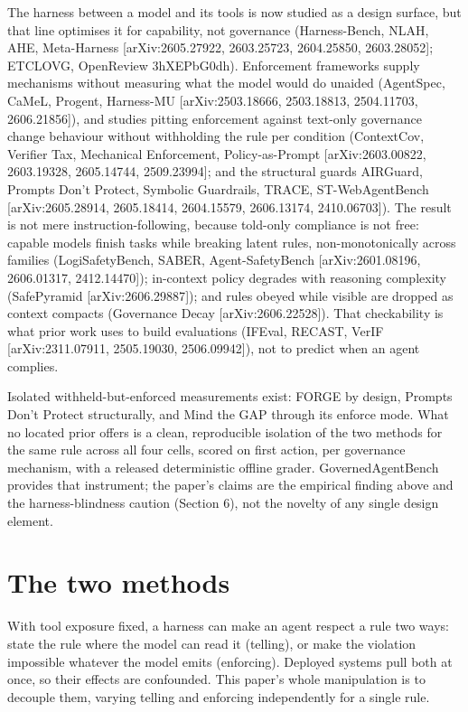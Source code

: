 \documentclass{article}
\begin{document}
The harness between a model and its tools is now studied as a design
surface, but that line optimises it for capability, not governance
(Harness-Bench, NLAH, AHE, Meta-Harness {[}arXiv:2605.27922, 2603.25723,
2604.25850, 2603.28052{]}; ETCLOVG, OpenReview 3hXEPbG0dh). Enforcement
frameworks supply mechanisms without measuring what the model would do
unaided (AgentSpec, CaMeL, Progent, Harness-MU {[}arXiv:2503.18666,
2503.18813, 2504.11703, 2606.21856{]}), and studies pitting enforcement
against text-only governance change behaviour without withholding the
rule per condition (ContextCov, Verifier Tax, Mechanical Enforcement,
Policy-as-Prompt {[}arXiv:2603.00822, 2603.19328, 2605.14744,
2509.23994{]}; and the structural guards AIRGuard, Prompts Don't
Protect, Symbolic Guardrails, TRACE, ST-WebAgentBench
{[}arXiv:2605.28914, 2605.18414, 2604.15579, 2606.13174, 2410.06703{]}).
The result is not mere instruction-following, because told-only
compliance is not free: capable models finish tasks while breaking
latent rules, non-monotonically across families (LogiSafetyBench, SABER,
Agent-SafetyBench {[}arXiv:2601.08196, 2606.01317, 2412.14470{]});
in-context policy degrades with reasoning complexity (SafePyramid
{[}arXiv:2606.29887{]}); and rules obeyed while visible are dropped as
context compacts (Governance Decay {[}arXiv:2606.22528{]}). That
checkability is what prior work uses to build evaluations (IFEval,
RECAST, VerIF {[}arXiv:2311.07911, 2505.19030, 2506.09942{]}), not to
predict when an agent complies.

Isolated withheld-but-enforced measurements exist: FORGE by design,
Prompts Don't Protect structurally, and Mind the GAP through its enforce
mode. What no located prior offers is a clean, reproducible isolation of
the two methods for the same rule across all four cells, scored on first
action, per governance mechanism, with a released deterministic offline
grader. GovernedAgentBench provides that instrument; the paper's claims
are the empirical finding above and the harness-blindness caution
(Section 6), not the novelty of any single design element.

\section{The two methods}\label{the-two-methods}

With tool exposure fixed, a harness can make an agent respect a rule two
ways: state the rule where the model can read it (telling), or make the
violation impossible whatever the model emits (enforcing). Deployed
systems pull both at once, so their effects are confounded. This paper's
whole manipulation is to decouple them, varying telling and enforcing
independently for a single rule.
\end{document}
